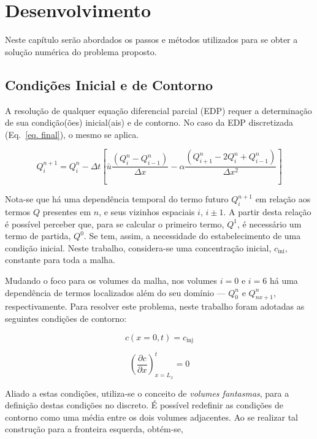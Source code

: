 \chapter{Desenvolvimento}
Neste capítulo serão abordados os passos e métodos utilizados para se obter a
solução numérica do problema proposto.

\section{Condições Inicial e de Contorno}
A resolução de qualquer equação diferencial parcial (EDP) requer a determinação
de sua condição(ões) inicial(ais) e de contorno. No caso da EDP discretizada
(Eq.\ \ref{eq. final}), o mesmo se aplica.

\[
    Q_i^{n+1} = Q_i^n - \Delta t
    \left[
    \bar{u}\frac{(Q_i^n - Q_{i-1}^n)}{\Delta x}
    -
    \alpha\frac{(Q_{i+1}^n - 2Q_i^n + Q_{i-1}^n)}{\Delta x^2}
    \right]
\]

Nota-se que há uma dependência temporal do termo futuro $Q_i^{n+1}$ em relação
aos termos $Q$ presentes em $n$, e seus vizinhos espaciais $i$, ${i\pm1}$. A
partir desta relação é possível perceber que, para se calcular o primeiro
termo, $Q^1$, é necessário um termo de partida, $Q^0$. Se tem, assim, a
necessidade do estabelecimento de uma condição inicial. Neste trabalho,
considera-se uma concentração inicial, $c_{\text{ini}}$, constante para toda a
malha.

Mudando o foco para os volumes da malha, nos volumes $i=0$ e $i=6$ há uma
dependência de termos localizados além do seu domínio --- $Q_0^n$ e
$Q_{nx+1}^n$, respectivamente. Para resolver este problema, neste trabalho
foram adotadas as seguintes condições de contorno:

\noindent
\begin{minipage}{.5\linewidth}
    \begin{equation}
        c(x=0,t) = c_{\text{inj}}
    \end{equation}
\end{minipage}%
\begin{minipage}{.5\linewidth}
    \begin{equation}
        \left(\frac{\partial c}{\partial x}\right)_{x=L_x}^t = 0
    \end{equation}
\end{minipage}

\bigskip

Aliado a estas condições, utiliza-se o conceito de \emph{volumes fantasmas},
para a definição destas condições no discreto. É possível redefinir as
condições de contorno como uma média entre os dois volumes adjacentes. Ao se
realizar tal construção para a fronteira esquerda, obtém-se,

